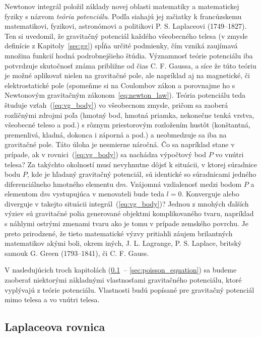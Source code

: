 \documentclass[a4paper, 12pt]{book}
\newcommand{\diff}{\mathrm d}
\begin{document}
Newtonov integrál položil základy novej oblasti matematiky a matematickej 
fyziky s názvom \emph{teória potenciálu}.  Podľa \cite{MacMillan1930} siahajú 
jej začiatky k francúzskemu matematikovi, fyzikovi, astronómovi a politikovi 
P. S. Laplaceovi (1749--1827).  Ten si uvedomil, že gravitačný potenciál 
každého všeobecného telesa (v zmysle definície z Kapitoly~\ref{sec:gg}) spĺňa 
určité podmienky, čím vzniká zaujímavá množina funkcií hodná podrobnejšieho 
štúdia.  Významnosť teórie potenciálu iba potvrdzuje skutočnosť známa približne 
od čias C. F. Gaussa, a síce že túto teóriu je možné aplikovať nielen na 
gravitačné pole, ale  napríklad aj na magnetické, či elektrostatické pole 
(spomeňme si na Coulombov zákon a porovnajme ho s Newtonovým gravitačným 
zákonom~\ref{eq:newton_law}).  Teória potenciálu teda študuje 
vzťah~(\ref{eq:vg_body}) vo všeobecnom zmysle, pričom sa zaoberá rozličnými 
zdrojmi poľa (hmotný bod, hmotná priamka, nekonečne tenká vrstva, všeobecné 
teleso a pod.) s rôznym priestorovým rozložením hustôt (konštantná, premenlivá, 
kladná, dokonca i záporná a pod.) a neobmedzuje sa iba na gravitačné pole.  
Táto úloha je nesmierne náročná.  Čo sa napríklad stane v prípade, ak 
v rovnici~(\ref{eq:vg_body}) sa nachádza výpočtový bod $P$ vo vnútri telesa?  
Za takýchto okolností musí nevyhnutne dôjsť k situácii, v ktorej súradnice bodu 
$P$, kde je hľadaný gravitačný potenciál, sú identické so súradnicami jedného 
diferenciálneho hmotného elementu $\diff m$.  Vzájomná vzdialenosť medzi bodom 
$P$ a elementom $\diff m$ vystupujúca v menovateli bude teda $l = 0$.  
Konverguje alebo diverguje v takejto situácii integrál~(\ref{eq:vg_body})?  
Jednou z mnohých ďalších výziev sú gravitačné polia generované objektmi 
komplikovaného tvaru, napríklad s náhlymi ostrými zmenami tvaru ako je tomu 
v prípade zemského povrchu.  Je preto prirodzené, že tieto matematické výzvy 
pritiahli záujem brilantných matematikov akými boli, okrem iných, 
J. L. Lagrange, P. S. Laplace, britský samouk G. Green (1793--1841), či 
C. F. Gauss.

V nasledujúcich troch kapitolách (\ref{sec:laplace_equation}~-- 
\ref{sec:poisson_equation}) sa budeme zaoberať niektorými základnými 
vlastnosťami gravitačného potenciálu, ktoré vyplývajú z teórie potenciálu.  
Vlastnosti budú popísané pre gravitačný potenciál mimo telesa a vo vnútri 
telesa.





\subsection{Laplaceova rovnica}
\label{sec:laplace_equation}
\end{document}
